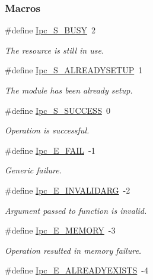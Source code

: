 \subsubsection*{Macros}
\begin{DoxyCompactItemize}
\item 
\#define \hyperlink{_ipc_8h_a0d668ce8a2a1411b52db7dd0c930e0f0}{Ipc\-\_\-\-S\-\_\-\-B\-U\-S\-Y}~2
\begin{DoxyCompactList}\small\item\em The resource is still in use. \end{DoxyCompactList}\item 
\#define \hyperlink{_ipc_8h_a1cffa46553c4e6cb6d699f9fdadadef8}{Ipc\-\_\-\-S\-\_\-\-A\-L\-R\-E\-A\-D\-Y\-S\-E\-T\-U\-P}~1
\begin{DoxyCompactList}\small\item\em The module has been already setup. \end{DoxyCompactList}\item 
\#define \hyperlink{_ipc_8h_a3f2ce5a89194a828588322cb29548360}{Ipc\-\_\-\-S\-\_\-\-S\-U\-C\-C\-E\-S\-S}~0
\begin{DoxyCompactList}\small\item\em Operation is successful. \end{DoxyCompactList}\item 
\#define \hyperlink{_ipc_8h_a156e22baea9b53fb663a7bb8684022f1}{Ipc\-\_\-\-E\-\_\-\-F\-A\-I\-L}~-\/1
\begin{DoxyCompactList}\small\item\em Generic failure. \end{DoxyCompactList}\item 
\#define \hyperlink{_ipc_8h_aaf0d0edb6356669b49dcf0429e7705e0}{Ipc\-\_\-\-E\-\_\-\-I\-N\-V\-A\-L\-I\-D\-A\-R\-G}~-\/2
\begin{DoxyCompactList}\small\item\em Argument passed to function is invalid. \end{DoxyCompactList}\item 
\#define \hyperlink{_ipc_8h_a55c40b7f048ac0aaf3b2836101c9dc81}{Ipc\-\_\-\-E\-\_\-\-M\-E\-M\-O\-R\-Y}~-\/3
\begin{DoxyCompactList}\small\item\em Operation resulted in memory failure. \end{DoxyCompactList}\item 
\#define \hyperlink{_ipc_8h_a31205e4f4d3cc31cc615926d466e920b}{Ipc\-\_\-\-E\-\_\-\-A\-L\-R\-E\-A\-D\-Y\-E\-X\-I\-S\-T\-S}~-\/4

\end{DoxyCompactItemize}

